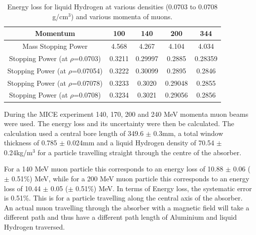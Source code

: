 \begin{table}
  \caption{
    Energy loss for liquid Hydrogen at various densities (0.0703 to 0.0708 g/cm${}^{3}$) and various momenta of muons.
  }
  \label{tab:Hydrogen}
  \begin{center}
    \begin{tabular}{|c c c c c|}
    \hline

Momentum & 100 & 140 & 200 & 344     \rule{0pt}{14pt} \\
\hline
{Mass Stopping Power} & 4.568 & 4.267 & 4.104 & 4.034 \\
{Stopping Power }(at $\rho$=0.0703)\textbf{} & 0.3211 & 0.29997 & 0.2885 & 0.28359\\
{Stopping Power }(at $\rho$=0.07054)\textbf{} & 0.3222 & 0.30099 & 0.2895 & 0.2846 \\
{Stopping Power }(at $\rho$=0.07078)\textbf{} & 0.3233 & 0.3020 & 0.29048 & 0.2855 \\
{Stopping Power }(at $\rho$=0.0708)\textbf{} & 0.3234 & 0.3021 & 0.29056 & 0.2856 \\
    \hline
    \end{tabular}
  \end{center}
\end{table} 


 During the MICE experiment 140, 170, 200 and 240 MeV momenta muon beams were used. The energy loss and its uncertainty were then be calculated. The calculation used a central bore length of 349.6 $\mathrm{\pm}$ 0.3mm, a total window thickness of 0.785 $\mathrm{\pm}$ 0.024mm and a liquid Hydrogen density of 70.54 $\mathrm{\pm}$ 0.24kg/m${}^{3}$ for a particle travelling straight through the centre of the absorber.

 For a 140 MeV muon particle this corresponds to an energy loss of 10.88 $\mathrm{\pm}$ 0.06 ($\mathrm{\pm}$ 0.51\%) MeV, while for a 200 MeV muon particle this corresponds to an energy loss of 10.44 $\mathrm{\pm}$ 0.05 ($\mathrm{\pm}$ 0.51\%) MeV. In terms of Energy loss, the systematic error is 0.51\%. This is for a particle travelling along the central axis of the absorber. An actual muon travelling through the absorber with a magnetic field will take a different path and thus have a different path length of Aluminium and liquid Hydrogen traversed.
 

